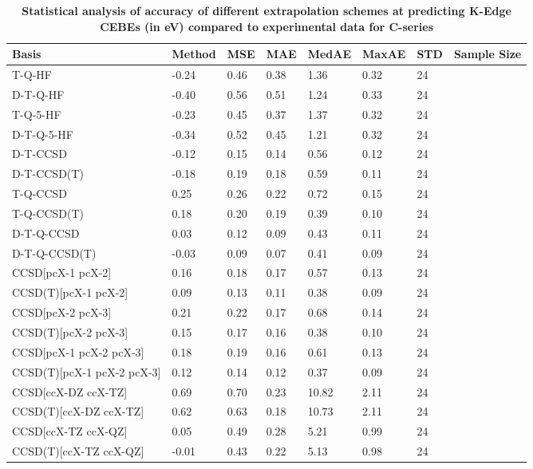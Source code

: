 \begin{table}
  \caption{\textbf{Statistical analysis of accuracy of different extrapolation schemes at predicting K-Edge CEBEs (in eV) compared to experimental data for C-series}}
  \label{tbl:extrap-scheme-summary-c}
  \begin{tabular}{l l l l l l l l }
    \toprule
    \textbf{Basis} & \textbf{Method} & \textbf{MSE} & \textbf{MAE} & \textbf{MedAE} & \textbf{MaxAE} & \textbf{STD} & \textbf{Sample Size} \\ 
    \midrule
    T-Q-HF & -0.24 & 0.46 & 0.38 & 1.36 & 0.32 & 24 \\ 
    D-T-Q-HF & -0.40 & 0.56 & 0.51 & 1.24 & 0.33 & 24 \\ 
    T-Q-5-HF & -0.23 & 0.45 & 0.37 & 1.37 & 0.32 & 24 \\ 
    D-T-Q-5-HF & -0.34 & 0.52 & 0.45 & 1.21 & 0.32 & 24 \\ 
    D-T-CCSD & -0.12 & 0.15 & 0.14 & 0.56 & 0.12 & 24 \\ 
    D-T-CCSD(T) & -0.18 & 0.19 & 0.18 & 0.59 & 0.11 & 24 \\ 
    T-Q-CCSD & 0.25 & 0.26 & 0.22 & 0.72 & 0.15 & 24 \\ 
    T-Q-CCSD(T) & 0.18 & 0.20 & 0.19 & 0.39 & 0.10 & 24 \\ 
    D-T-Q-CCSD & 0.03 & 0.12 & 0.09 & 0.43 & 0.11 & 24 \\ 
    D-T-Q-CCSD(T) & -0.03 & 0.09 & 0.07 & 0.41 & 0.09 & 24 \\ 
    CCSD[pcX-1 pcX-2] & 0.16 & 0.18 & 0.17 & 0.57 & 0.13 & 24 \\ 
    CCSD(T)[pcX-1 pcX-2] & 0.09 & 0.13 & 0.11 & 0.38 & 0.09 & 24 \\ 
    CCSD[pcX-2 pcX-3] & 0.21 & 0.22 & 0.17 & 0.68 & 0.14 & 24 \\ 
    CCSD(T)[pcX-2 pcX-3] & 0.15 & 0.17 & 0.16 & 0.38 & 0.10 & 24 \\ 
    CCSD[pcX-1 pcX-2 pcX-3] & 0.18 & 0.19 & 0.16 & 0.61 & 0.13 & 24 \\ 
    CCSD(T)[pcX-1 pcX-2 pcX-3] & 0.12 & 0.14 & 0.12 & 0.37 & 0.09 & 24 \\ 
    CCSD[ccX-DZ ccX-TZ] & 0.69 & 0.70 & 0.23 & 10.82 & 2.11 & 24 \\ 
    CCSD(T)[ccX-DZ ccX-TZ] & 0.62 & 0.63 & 0.18 & 10.73 & 2.11 & 24 \\ 
    CCSD[ccX-TZ ccX-QZ] & 0.05 & 0.49 & 0.28 & 5.21 & 0.99 & 24 \\ 
    CCSD(T)[ccX-TZ ccX-QZ] & -0.01 & 0.43 & 0.22 & 5.13 & 0.98 & 24 \\ 

\end{tabular}
\end{table}

